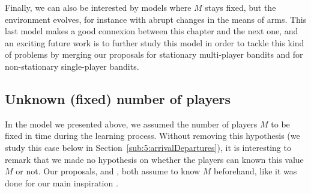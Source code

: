 Finally, we can also be interested by models where $M$ stays fixed, but the environment evolves, for instance with abrupt changes in the means of arms. This last model makes a good connexion between this chapter and the next one, and an exciting future work is to further study this model in order to tackle this kind of problems by merging our proposals for stationary multi-player bandits and for non-stationary single-player bandits.



\subsection{Unknown (fixed) number of players}
\label{sub:5:unknownNumberOfPlayers}

In the model we presented above, we assumed the number of players $M$ to be fixed in time during the learning process.
Without removing this hypothesis (we study this case below in Section~\ref{sub:5:arrivalDepartures}), it is interesting to remark that we made no hypothesis on whether the players can known this value $M$ or not.
Our proposals, \RandTopM{} and \MCTopM, both assume to know $M$ beforehand, like it was done for our main inspiration \RhoRand.


